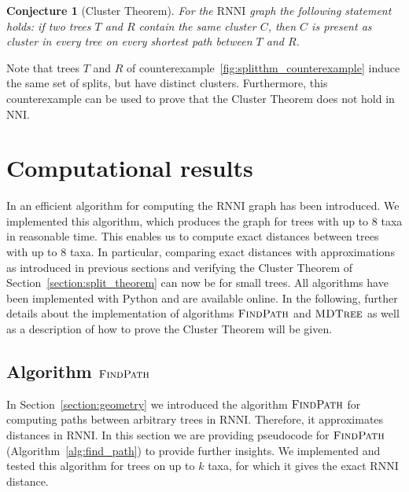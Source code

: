\documentclass{amsart}
\newcommand{\nni}{\mathrm{NNI}}
\newcommand{\rnni}{\mathrm{RNNI}}
\newcommand{\findpath}{\textsc{FindPath}}
\newcommand{\mdtree}{\textsc{MDTree}}
\newtheorem{conjecture}[definition]{Conjecture}
\begin{document}
\begin{conjecture}[Cluster Theorem]
	For the $\rnni$ graph the following statement holds:
	if two trees $T$ and $R$ contain the same cluster $C$, then $C$ is present as cluster in every tree on every shortest path between $T$ and $R$.
	\label{conjecture:cluster_theorem}
\end{conjecture}

Note that trees $T$ and $R$ of counterexample~\ref{fig:splitthm_counterexample} induce the same set of splits, but have distinct clusters.
Furthermore, this counterexample can be used to prove that the Cluster Theorem does not hold in $\nni$.

\section{Computational results}
\label{section:computation}

In \autocite{Gavryushkin2018-ol} an efficient algorithm for computing the $\rnni$ graph has been introduced.
We implemented this algorithm, which produces the graph for trees with up to $8$ taxa in reasonable time. 
This enables us to compute exact distances between trees with up to $8$ taxa.
In particular, comparing exact distances with approximations as introduced in previous sections and verifying the Cluster Theorem of Section~\ref{section:split_theorem} can now be for small trees.
All algorithms have been implemented with Python and are available online. 
In the following, further details about the implementation of algorithms $\findpath$ and $\mdtree$ as well as a description of how to prove the Cluster Theorem will be given.

\subsection{Algorithm $\findpath$}
\label{section:computation_findpath}

In Section~\ref{section:geometry} we introduced the algorithm $\findpath$ for computing paths between arbitrary trees in $\rnni$.
Therefore, it approximates distances in $\rnni$.
In this section we are providing pseudocode for $\findpath$ (Algorithm~\ref{alg:find_path}) to provide further insights.
We implemented and tested this algorithm for trees on up to $k$ taxa, for which it gives the exact $\rnni$ distance. 
\end{document}
